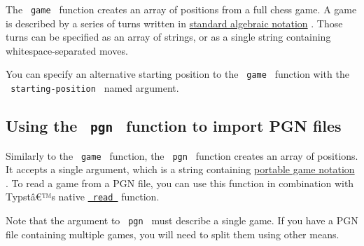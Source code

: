 The \texttt{\ game\ } function creates an array of positions from a full
chess game. A game is described by a series of turns written in
\href{https://en.wikipedia.org/wiki/Algebraic_notation_(chess)}{standard
algebraic notation} . Those turns can be specified as an array of
strings, or as a single string containing whitespace-separated moves.

\begin{Shaded}
\begin{Highlighting}[]
\NormalTok{)}
\end{Highlighting}
\end{Shaded}

\pandocbounded{}

You can specify an alternative starting position to the
\texttt{\ game\ } function with the \texttt{\ starting-position\ } named
argument.

\subsection{\texorpdfstring{Using the \texttt{\ pgn\ } function to
import PGN
files}{Using the  pgn  function to import PGN files}}\label{using-the-pgn-function-to-import-pgn-files}

Similarly to the \texttt{\ game\ } function, the \texttt{\ pgn\ }
function creates an array of positions. It accepts a single argument,
which is a string containing
\href{https://en.wikipedia.org/wiki/Portable_Game_Notation}{portable
game notation} . To read a game from a PGN file, you can use this
function in combination with Typstâ€™s native
\href{https://typst.app/docs/reference/data-loading/read/}{\texttt{\ read\ }}
function.

\begin{Shaded}
\begin{Highlighting}[]
\end{Highlighting}
\end{Shaded}

Note that the argument to \texttt{\ pgn\ } must describe a single game.
If you have a PGN file containing multiple games, you will need to split
them using other means.

